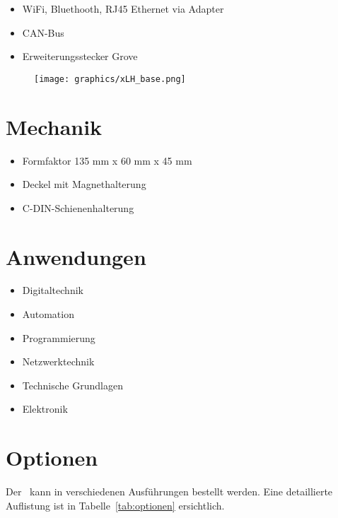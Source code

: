 \begin{itemize}
    \item WiFi, Bluethooth, RJ45 Ethernet via Adapter
    \item CAN-Bus
    \item Erweiterungsstecker Grove
\end{itemize}

\vfill\break

\begin{figure}[h]
    \centering
    \texttt{[image: graphics/xLH\_base.png]}
\end{figure}

\section{Mechanik}

\begin{itemize}
    \item Formfaktor 135 mm x 60 mm x 45 mm
    \item Deckel mit Magnethalterung
    \item C-DIN-Schienenhalterung
\end{itemize}

\section{Anwendungen}

\begin{itemize}
    \item Digitaltechnik
    \item Automation
    \item Programmierung
    \item Netzwerktechnik
    \item Technische Grundlagen
    \item Elektronik
\end{itemize}

\vfill\break


\onecolumn

\section{Optionen}
Der \lernplattformname\ kann in verschiedenen Ausführungen bestellt werden.
Eine detaillierte Auflistung ist in Tabelle~\ref{tab:optionen} ersichtlich.

